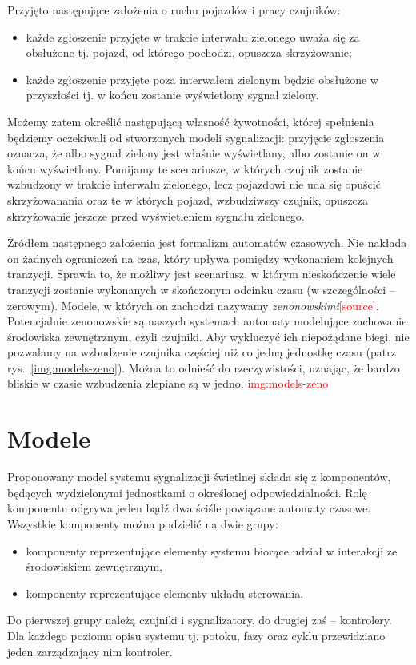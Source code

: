 \documentclass{pracamgr}
\newcommand{\imgr}[1]{rys.~\ref{#1}}
\newcommand{\todo}[1]{\textcolor{red}{#1}}
\newcommand{\todocite}{\todo{[source]}}
\theoremstyle{plain}
\begin{document}
Przyjęto następujące założenia o ruchu pojazdów i pracy czujników:
\begin{itemize}
  \item każde zgłoszenie przyjęte w trakcie interwału zielonego uważa
  się za obsłużone tj. pojazd, od którego pochodzi, opuszcza
  skrzyżowanie;
  \item każde zgłoszenie przyjęte poza interwałem zielonym będzie
  obsłużone w przyszłości tj. w końcu zostanie wyświetlony sygnał zielony.
\end{itemize}
Możemy zatem określić następującą własność żywotności, której
spełnienia będziemy oczekiwali od stworzonych modeli sygnalizacji:
przyjęcie zgłoszenia oznacza, że albo sygnał zielony jest właśnie
wyświetlany, albo zostanie on w końcu wyświetlony. Pomijamy te
scenariusze, w których czujnik zostanie wzbudzony w trakcie interwału
zielonego, lecz pojazdowi nie uda się opuścić skrzyżowanania oraz te w
których pojazd, wzbudziwszy czujnik, opuszcza skrzyżowanie jeszcze
przed wyświetleniem sygnału zielonego.

Źródłem następnego założenia jest formalizm automatów czasowych. Nie
nakłada on żadnych ograniczeń na czas, który upływa pomiędzy
wykonaniem kolejnych tranzycji. Sprawia to, że możliwy jest
scenariusz, w którym nieskończenie wiele tranzycji zostanie wykonanych
w skończonym odcinku czasu (w szczególności -- zerowym). Modele, w
których on zachodzi nazywamy \emph{zenonowskimi}\todocite.
Potencjalnie zenonowskie są naszych systemach automaty modelujące
zachowanie środowiska zewnętrznym, czyli czujniki. Aby wykluczyć ich
niepożądane biegi, nie pozwalamy na wzbudzenie czujnika częściej niż
co jedną jednostkę czasu (patrz \imgr{img:models-zeno}). Można to
odnieść do rzeczywistości, uznając, że bardzo bliskie w czasie
wzbudzenia zlepiane są w jedno.  \todo{img:models-zeno}

\section{Modele}
\label{s:models:models}
Proponowany model systemu sygnalizacji świetlnej składa się z
komponentów, będących wydzielonymi jednostkami o określonej
odpowiedzialności. Rolę komponentu odgrywa jeden bądź dwa ściśle
powiązane automaty czasowe. Wszystkie komponenty można podzielić na
dwie grupy:
\begin{itemize}
  \item komponenty reprezentujące elementy systemu biorące udział w
  interakcji ze środowiskiem zewnętrznym,
  \item komponenty reprezentujące elementy układu sterowania.
\end{itemize}
Do pierwszej grupy należą czujniki i sygnalizatory, do drugiej zaś --
kontrolery. Dla każdego poziomu opisu systemu tj. potoku, fazy oraz
cyklu przewidziano jeden zarządzający nim kontroler.
\end{document}
